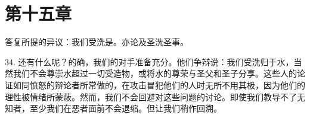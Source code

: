 
\section{第十五章}

答复所提的异议：我们受洗是。亦论及圣洗圣事。\par

34. 还有什么呢？的确，我们的对手准备充分。他们争辩说：我们受洗归于水，当然我们不会尊崇水超过一切受造物，或将水的尊荣与圣父和圣子分享。这些人的论证如同愤怒的辩论者所常做的，在攻击冒犯他们的人时无所不用其极，因为他们的理性被情绪所蒙蔽。然而，我们不会回避对这些问题的讨论。即使我们教导不了无知者，至少我们在恶者面前不会退缩。但让我们稍作回溯。\par

